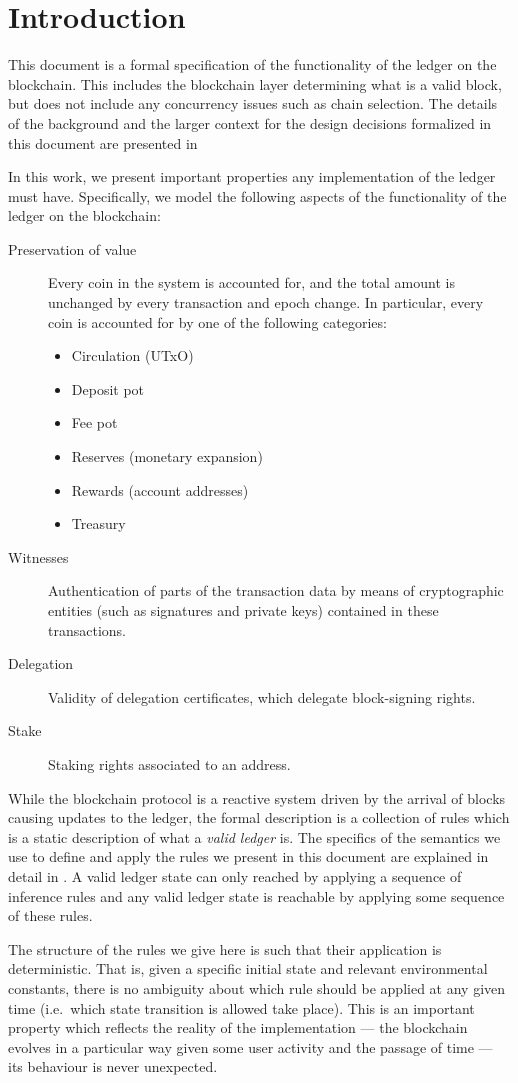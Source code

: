 \section{Introduction}
\label{sec:introduction-shelley}

This document is a formal specification of the functionality of the ledger on the blockchain.
This includes the blockchain layer determining what is a valid block,
but does not include any concurrency issues such as chain selection.
The details of the background and the larger context
for the design decisions formalized in this document are presented
in~\cite{delegation_design}

In this work,
we present important properties any implementation of the ledger must have.
Specifically, we model the following aspects
of the functionality of the ledger on the blockchain:

\begin{description}
\item[Preservation of value] Every coin in the system is accounted for,
  and the total amount is unchanged by every transaction and epoch change.
  In particular, every coin is accounted for by one of the following categories:
  \begin{itemize}
    \item Circulation (UTxO)
    \item Deposit pot
    \item Fee pot
    \item Reserves (monetary expansion)
    \item Rewards (account addresses)
    \item Treasury
  \end{itemize}
\item[Witnesses] Authentication of parts of the transaction data by means of
  cryptographic entities (such as signatures and private keys) contained in
  these transactions.
\item[Delegation] Validity of delegation certificates, which delegate
  block-signing rights.
\item[Stake] Staking rights associated to an address.
\end{description}

While the blockchain protocol is a reactive system driven by the arrival
of blocks causing updates to the ledger, the formal description is a collection
of rules which is a
static description of what a \textit{valid ledger} is. The specifics of the
semantics we use to define and apply
the rules we present in this document are explained in detail in
\cite{small_step_semantics}. A valid ledger state can only
reached by applying a sequence of inference rules and any valid ledger state
is reachable by applying some sequence of these rules.

The structure of the rules we give here is such that their application is
deterministic. That is, given a specific initial state and relevant environmental
constants, there is no ambiguity
about which rule should be applied at any given time (i.e.~which state
transition is allowed take place). This is an important property which reflects
the reality of the implementation --- the blockchain evolves in a particular way
given some user activity and the passage of time --- its behaviour is
never unexpected.
